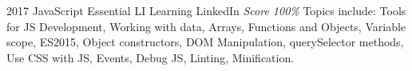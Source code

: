 \documentclass[11pt,a4paper]{moderncv}
\begin{document}
\cventry                                                                                                          %
    {2017}                                                                                                        %
    {JavaScript Essential}                                                                                        %
    {LI Learning}                                                                                                 %
    {LinkedIn}                                                                                                    %
    {\textit{Score 100\%}}                                                                                        %
    {                                                                                                             %
        Topics include:                                                                                           %
            Tools for JS Development,                                                                             %
            Working with data,                                                                                    %
            Arrays,                                                                                               %
            Functions and Objects,                                                                                %
            Variable scope,                                                                                       %
            ES2015,                                                                                               %
            Object constructors,                                                                                  %
            DOM Manipulation,                                                                                     %
            querySelector methods,                                                                                %
            Use CSS with JS,                                                                                      %
            Events,                                                                                               %
            Debug JS,                                                                                             %
            Linting,                                                                                              %
            Minification.                                                                                         %
    }                                                                                                             %
\end{document}
